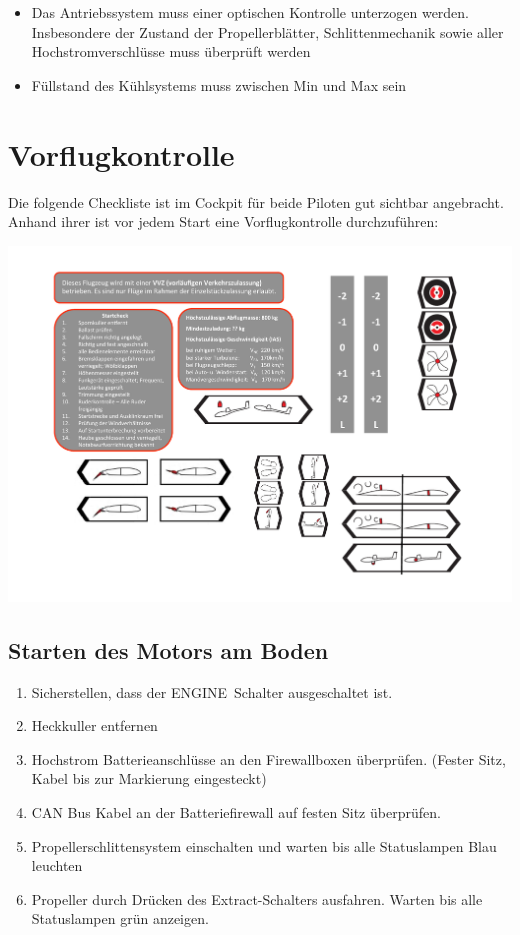 \begin{itemize}
\item Das Antriebssystem muss einer optischen Kontrolle unterzogen werden. Insbesondere der Zustand der Propellerblätter, Schlittenmechanik sowie aller Hochstromverschlüsse muss überprüft werden
\item  Füllstand des Kühlsystems muss zwischen Min und Max sein
\end{itemize}

\section{Vorflugkontrolle}
Die folgende Checkliste ist im Cockpit für beide Piloten gut sichtbar angebracht. Anhand ihrer ist vor jedem Start eine Vorflugkontrolle durchzuführen:
\begin{center}
\includegraphics[width=.45\textwidth]{bilder/startcheck.pdf}
\end{center}

\subsection{Starten des Motors am Boden}

\begin{enumerate}
\item Sicherstellen, dass der \glqq ENGINE\grqq\ Schalter ausgeschaltet ist.
\item Heckkuller entfernen
\item Hochstrom Batterieanschlüsse an den Firewallboxen überprüfen. (Fester Sitz, Kabel bis zur Markierung eingesteckt)
\item CAN Bus Kabel an der Batteriefirewall auf festen Sitz überprüfen.
\item Propellerschlittensystem einschalten und warten bis alle Statuslampen Blau leuchten
\item Propeller durch Drücken des \glqq Extract\grqq-Schalters ausfahren. Warten bis alle Statuslampen grün anzeigen.
\end{enumerate}

